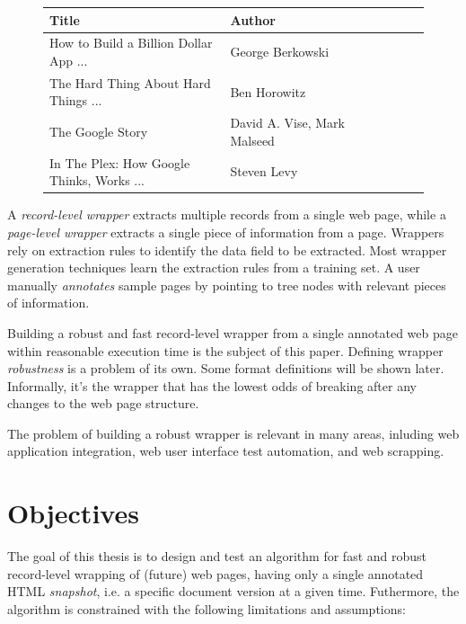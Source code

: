 \begin{figure}[h]
	\centering
    \begin{tabularx}{\textwidth}{ | l | l | l | l | l | l | p{5cm} |}
		\hline
		\textbf{Title} & \textbf{Author} \\ 
		\hline
		How to Build a Billion Dollar App ... & George Berkowski \\ 
		\hline
		The Hard Thing About Hard Things ... & Ben Horowitz \\ 
		\hline
		The Google Story & David A. Vise, Mark Malseed \\ 
		\hline
		In The Plex: How Google Thinks, Works ... & Steven Levy \\ 
		\hline
    \end{tabularx}
\end{figure}

A \emph{record-level wrapper} extracts multiple records from a single web page, while a \emph{page-level wrapper} extracts a single piece of information from a page. Wrappers rely on extraction rules to identify the data field to be extracted. Most wrapper generation techniques learn the extraction rules from a training set. A user manually \emph{annotates} sample pages by pointing to tree nodes with relevant pieces of information.

Building a robust and fast record-level wrapper from a single annotated web page within reasonable execution time is the subject of this paper. Defining wrapper \emph{robustness} is a problem of its own. Some format definitions will be shown later. Informally, it's the wrapper that has the lowest odds of breaking after any changes to the web page structure.

The problem of building a robust wrapper is relevant in many areas, inluding web application integration, web user interface test automation, and web scrapping.


\section{Objectives}

The goal of this thesis is to design and test an algorithm for fast and robust record-level wrapping of (future) web pages, having only a single annotated HTML \emph{snapshot}, i.e. a specific document version at a given time. Futhermore, the algorithm is constrained with the following limitations and assumptions:

